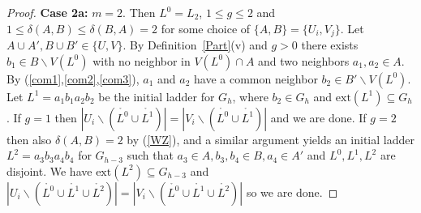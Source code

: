 \documentclass[oneside,12pt]{memoir}
\newcommand{\aster}{\textasteriskcentered}
\newcommand{\ssm}{\smallsetminus}
\begin{document}
\begin{proof}


\noindent\textbf{Case 2a:} $m=2$. Then $L^0=L_2$, $1\le g\le2$ and $1\le \delta(A,B)\le\delta(B,A)=2$ for some choice of $\{A,B\}=\{U_i,V_j\}$. Let $A\cup A',B\cup B'\in\{U,V\}$. By Definition~\ref{Part}(v) and $g>0$ there exists $b_1\in B\ssm V(L^0)$ with no neighbor in $V(L^0)\cap A$ and two neighbors $a_1,a_2\in A$. By (\ref{com1},\ref{com2},\ref{com3}), $a_1$ and $a_2$ have a common neighbor $b_2\in B'\ssm V(L^0)$. Let $L^1=a_1b_1a_2b_2$ be the initial ladder for $G_{h}$, where $b_2\in G_h$ and $\mathrm{ext}(L^1)\subseteq G_h$. If $g=1$ then $|U_i\ssm (\mathring{L^0}\cup \mathring{L^1})|=|V_i\ssm (\mathring{L^0}\cup \mathring{L^1})|$ and we are done. If $g=2$ then also $\delta(A,B)=2$ by (\ref{WZ}), and a similar argument yields an initial ladder $L^{2}=a_3b_3a_4b_4$ for $G_{h-3}$ such that $a_3\in A,b_3,b_4\in B,a_4\in A'$ and $L^0,L^1,L^2$ are disjoint.  We have $\mathrm{ext}(L^2)\subseteq G_{h-3}$ and $|U_i\ssm (\mathring{L^0}\cup \mathring{L^1}\cup \mathring{L^2})|=|V_i\ssm (\mathring{L^0}\cup \mathring{L^1}\cup \mathring{L^2})|$ so we are done.


\end{proof}
\end{document}
